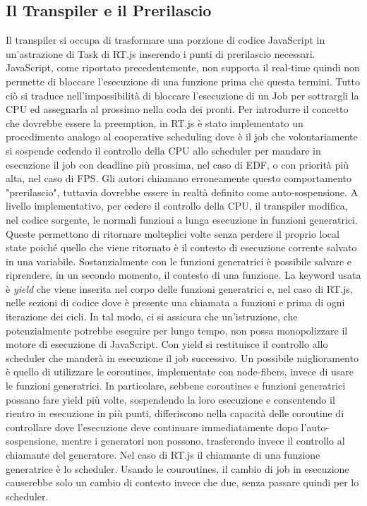\documentclass[conference]{IEEEtran}
\begin{document}
\subsection{Il Transpiler e il Prerilascio}
Il transpiler si occupa di trasformare una porzione di codice JavaScript in un'astrazione di Task di RT.js inserendo i punti di prerilascio necessari.
\newline
JavaScript, come riportato precedentemente, non supporta il real-time quindi non permette di bloccare l'esecuzione di una funzione prima che questa termini. Tutto ciò si traduce nell'impossibilità di bloccare l'esecuzione di un Job per sottrargli la CPU ed assegnarla al prossimo nella coda dei pronti.
\newline
Per introdurre il concetto che dovrebbe essere la preemption, in RT.js è stato implementato un procedimento analogo al cooperative scheduling dove è il job che volontariamente si sospende cedendo il controllo della CPU allo scheduler per mandare in esecuzione il job con deadline più prossima, nel caso di EDF, o con priorità più alta, nel caso di FPS. Gli autori chiamano erroneamente questo comportamento "prerilascio", tuttavia dovrebbe essere in realtà definito come auto-sospensione.
\newline
A livello implementativo, per cedere il controllo della CPU, il transpiler modifica, nel codice sorgente, le normali funzioni a lunga esecuzione in funzioni generatrici. Queste permettono di ritornare molteplici volte senza perdere il proprio local state poiché quello che viene ritornato è il contesto di esecuzione corrente salvato in una variabile. Sostanzialmente con le funzioni generatrici è possibile salvare e riprendere, in un secondo momento, il contesto di una funzione. La keyword usata è \textit{yield} che viene inserita nel corpo delle funzioni generatrici e, nel caso di RT.js, nelle sezioni di codice dove è presente una chiamata a funzioni e prima di ogni iterazione dei cicli. In tal modo, ci si assicura che un'istruzione, che potenzialmente potrebbe eseguire per lungo tempo, non possa monopolizzare il motore di esecuzione di JavaScript. Con yield si restituisce il controllo allo scheduler che manderà in esecuzione il job successivo. 
\newline
Un possibile miglioramento è quello di utilizzare le coroutines, implementate con node-fibers, invece di usare le funzioni generatrici. In particolare, sebbene coroutines e funzioni generatrici possano fare yield più volte, sospendendo la loro esecuzione e consentendo il rientro in esecuzione in più punti, differiscono nella capacità delle coroutine di controllare dove l'esecuzione deve continuare immediatamente dopo l'auto-sospensione, mentre i generatori non possono, trasferendo invece il controllo al chiamante del generatore. Nel caso di RT.js il chiamante di una funzione generatrice è lo scheduler. Usando le couroutines, il cambio di job in esecuzione causerebbe solo un cambio di contesto invece che due, senza passare quindi per lo scheduler.  
\end{document}
